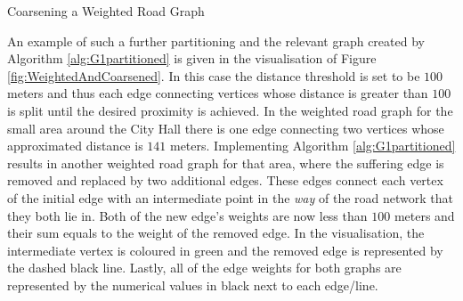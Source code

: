 \documentclass[12pt]{article}
\theoremstyle{definition}
\begin{document}
\begin{algorithm}
  \caption{Coarsening a Weighted Road Graph}
  \label{alg:G1partitioned}
  \begin{algorithmic}
            \Else
            \EndIf
        \EndFor
            
        \EndIf
    \EndFor    
    \EndProcedure
  \end{algorithmic}
\end{algorithm}


An example of such a further partitioning and the relevant graph created by Algorithm \ref{alg:G1partitioned} is given in the visualisation of Figure \ref{fig:WeightedAndCoarsened}. In this case the distance threshold is set to be $100$ meters and thus each edge connecting vertices whose distance is greater than $100$ is split until the desired proximity is achieved. In the weighted road graph for the small area around the City Hall there is one edge connecting two vertices whose approximated distance is $141$ meters. Implementing Algorithm \ref{alg:G1partitioned} results in another weighted road graph for that area, where the suffering edge is removed and replaced by two additional edges. These edges connect each vertex of the initial edge with an intermediate point in the \textit{way} of the road network that they both lie in. Both of the new edge's weights are now less than $100$ meters and their sum equals to the weight of the removed edge. In the visualisation, the intermediate vertex is coloured in green and the removed edge is represented by the dashed black line. Lastly, all of the edge weights for both graphs are represented by the numerical values in black next to each edge/line. 
\end{document}
